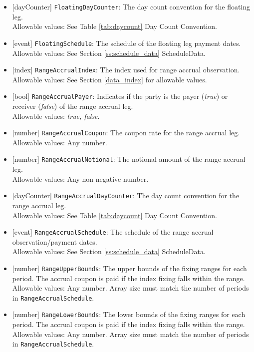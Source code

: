 \begin{itemize}
  Allowable values: Any number.
  \item{}[dayCounter] \lstinline!FloatingDayCounter!: The day count convention for the floating leg. \\
  Allowable values: See Table \ref{tab:daycount} Day Count Convention.
  \item{}[event] \lstinline!FloatingSchedule!: The schedule of the floating leg payment dates. \\
  Allowable values: See Section \ref{ss:schedule_data} ScheduleData.
  \item{}[index] \lstinline!RangeAccrualIndex!: The index used for range accrual observation. \\
  Allowable values: See Section \ref{data_index} for allowable values.
  \item{}[bool] \lstinline!RangeAccrualPayer!: Indicates if the party is the payer (\emph{true}) or receiver (\emph{false}) of the range accrual leg. \\
  Allowable values: \emph{true, false}.
  \item{}[number] \lstinline!RangeAccrualCoupon!: The coupon rate for the range accrual leg. \\
  Allowable values: Any number.
  \item{}[number] \lstinline!RangeAccrualNotional!: The notional amount of the range accrual leg. \\
  Allowable values: Any non-negative number.
  \item{}[dayCounter] \lstinline!RangeAccrualDayCounter!: The day count convention for the range accrual leg. \\
  Allowable values: See Table \ref{tab:daycount} Day Count Convention.
  \item{}[event] \lstinline!RangeAccrualSchedule!: The schedule of the range accrual observation/payment dates. \\
  Allowable values: See Section \ref{ss:schedule_data} ScheduleData.
  \item{}[number] \lstinline!RangeUpperBounds!: The upper bounds of the fixing ranges for each period. The accrual coupon is paid if the index fixing falls within the range. \\
  Allowable values: Any number. Array size must match the number of periods in \lstinline!RangeAccrualSchedule!.
  \item{}[number] \lstinline!RangeLowerBounds!: The lower bounds of the fixing ranges for each period. The accrual coupon is paid if the index fixing falls within the range. \\
  Allowable values: Any number. Array size must match the number of periods in \lstinline!RangeAccrualSchedule!.
\end{itemize}

\clearpage
